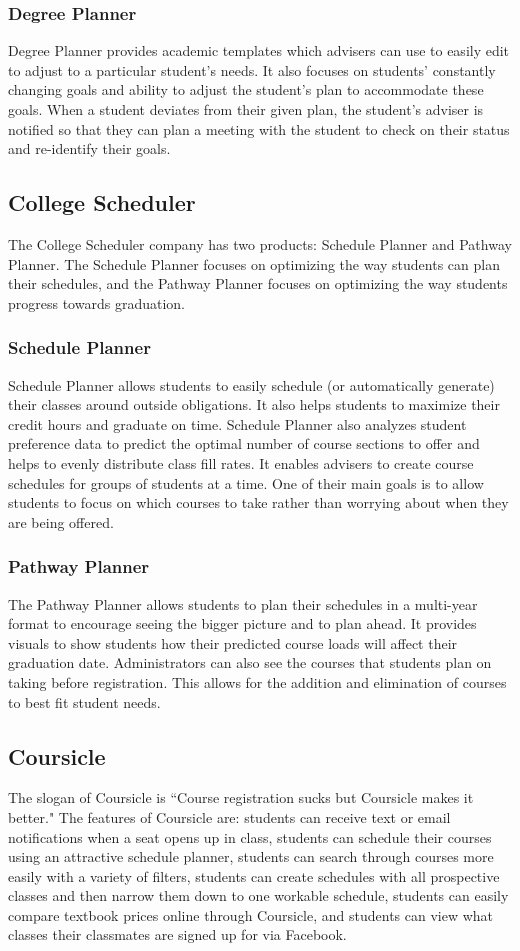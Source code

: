 \subsubsection{Degree Planner}
Degree Planner provides academic templates which advisers can use to easily edit to adjust to a particular student's needs. It also focuses on students' constantly changing goals and ability to adjust the student's plan to accommodate these goals. When a student deviates from their given plan, the student's adviser is notified so that they can plan a meeting with the student to check on their status and re-identify their goals. 

\subsection{College Scheduler}
The College Scheduler company has two products: Schedule Planner and Pathway Planner. The Schedule Planner focuses on optimizing the way students can plan their schedules, and the Pathway Planner focuses on optimizing the way students progress towards graduation.
\subsubsection{Schedule Planner}
Schedule Planner allows students to easily schedule (or automatically generate) their classes around outside obligations. It also helps students to maximize their credit hours and graduate on time. Schedule Planner also analyzes student preference data to predict the optimal number of course sections to offer and helps to evenly distribute class fill rates. It enables advisers to create course schedules for groups of students at a time. One of their main  goals is to allow students to focus on which courses to take rather than worrying about when they are being offered.
\subsubsection{Pathway Planner}
The Pathway Planner allows students to plan their schedules in a multi-year format to encourage seeing the bigger picture and to plan ahead. It provides visuals to show students how their predicted course loads will affect their graduation date. Administrators can also see the courses that students plan on taking before registration. This allows for the addition and elimination of courses to best fit student needs. 

\subsection{Coursicle}
The slogan of Coursicle is ``Course registration sucks but Coursicle makes it better." The features of Coursicle are: students can receive text or email notifications when a seat opens up in class, students can schedule their courses using an attractive schedule planner, students can search through courses more easily with a variety of filters, students can create schedules with all prospective classes and then narrow them down to one workable schedule, students can easily compare textbook prices online through Coursicle, and students can view what classes their classmates are signed up for via Facebook. 

